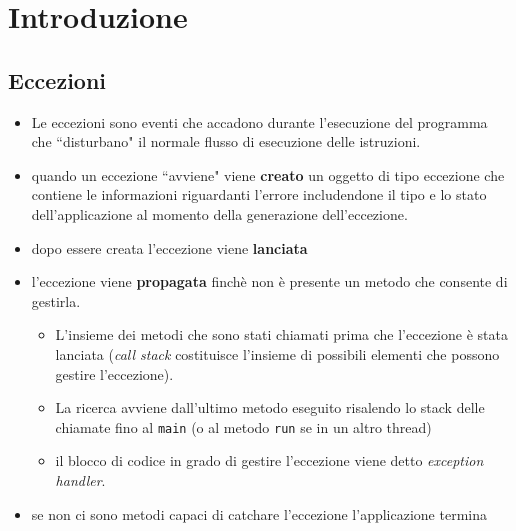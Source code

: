 \documentclass{article}
\author{\textbf{\hmwkAuthorName}}
\date{} %
\begin{document}
\maketitle



\newpage
\tableofcontents
\newpage



\section{Introduzione}


\subsection{Eccezioni}
\begin{itemize}
\item Le eccezioni sono eventi che accadono durante l'esecuzione del programma  che ``disturbano" il normale flusso di esecuzione delle istruzioni. 
\item quando un eccezione ``avviene" viene \textbf{creato} un oggetto di tipo eccezione che contiene le informazioni riguardanti l'errore includendone il tipo e lo stato dell'applicazione al momento della generazione dell'eccezione.
\item dopo essere creata l'eccezione viene \textbf{lanciata}
\item l'eccezione viene \textbf{propagata} finch\`e non \`e presente un metodo che consente di gestirla.
\begin{itemize}
\item L'insieme dei metodi che sono stati chiamati prima che l'eccezione \`e stata lanciata (\emph{call stack} costituisce l'insieme di possibili elementi che possono gestire l'eccezione). 
\item La ricerca avviene dall'ultimo metodo eseguito risalendo lo stack delle chiamate fino al \texttt{main} (o al metodo \texttt{run} se in un altro thread)
\item il blocco di codice in grado di gestire l'eccezione viene detto \emph{exception handler}.
\end{itemize}
\item se non ci sono metodi capaci di catchare l'eccezione l'applicazione termina
\end{itemize}
\end{document}

